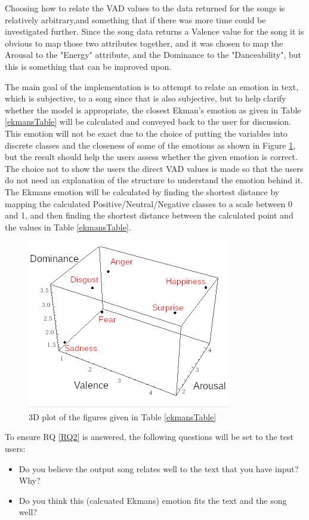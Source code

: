 Choosing how to relate the VAD values to the data returned for the songs is relatively arbitrary,and something that if there was more time could be investigated further. Since the song data returns a Valence value for the song it is obvious to map those two attributes together, and it was chosen to map the Arousal to the "Energy" attribute, and the Dominance to the "Danceability", but this is something that can be improved upon.

The main goal of the implementation is to attempt to relate an emotion in text, which is subjective, to a song since that is also subjective, but to help clarify whether the model is appropriate, the closest Ekman's emotion as given in Table \ref{ekmansTable} will be calculated and conveyed back to the user for discussion. This emotion will not be exact due to the choice of putting the variables into discrete classes and the closeness of some of the emotions as shown in Figure \ref{ekmans:graph}, but the result should help the users assess whether the given emotion is correct. The choice not to show the users the direct VAD values is made so that the users do not need an explanation of the structure to understand the emotion behind it. The Ekmans emotion will be calculated by finding the shortest distance by mapping the calculated Positive/Neutral/Negative classes to a scale between 0 and 1, and then finding the shortest distance between the calculated point and the values in Table \ref{ekmansTable}.

\begin{figure}[ht]
\centering
\includegraphics[scale=2]{litImgs/Ekmans3d.png}
\caption{3D plot of the figures given in Table \ref{ekmansTable}}
\label{ekmans:graph}
\end{figure}


To ensure RQ \ref{RQ2} is answered, the following questions will be set to the test users:

\begin{itemize}
    \item Do you believe the output song relates well to the text that you have input? Why?
    \item Do you think this (calcuated Ekmans) emotion fits the text and the song well?
\end{itemize}